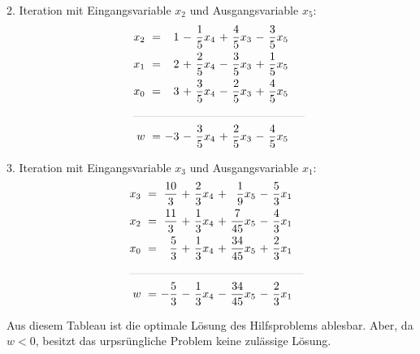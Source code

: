 \documentclass [a4paper,11pt]{article}
\begin{document}
\begin{enumerate}
\begin{enumerate}
            2. Iteration mit Eingangsvariable $x_2$ und Ausgangsvariable $x_5$:
            \begin{align*}
            \begin{alignedat}{6}
            && x_2 &\ = &\ 1 &\ - &\ \frac{1}{5}x_4 &\ + &\ \frac{4}{5}x_3 &\ - &\ \frac{3}{5}x_5 \\
            && x_1 &\ = &\ 2 &\ + &\ \frac{2}{5}x_4 &\ - &\ \frac{3}{5}x_3 &\ + &\ \frac{1}{5}x_5 \\
            && x_0 &\ = &\ 3 &\ + &\ \frac{3}{5}x_4 &\ - &\ \frac{2}{5}x_3 &\ + &\ \frac{4}{5}x_5 \\
            &\rlap{\rule{5.3cm}{.1pt}} &&&&&&&&&\\
            && w   &\ = &\ -3 &\ - &\ \frac{3}{5}x_4 &\ + &\ \frac{2}{5}x_3 &\ - &\ \frac{4}{5}x_5
            \end{alignedat}
            \end{align*}

            3. Iteration mit Eingangsvariable $x_3$ und Ausgangsvariable $x_1$:
            \begin{align*}
            \begin{alignedat}{6}
            && x_3 &\ = &\ \frac{10}{3} &\ + &\ \frac{2}{3}x_4 &\ + &\   \frac{1}{9}x_5 &\ - &\ \frac{5}{3}x_1 \\
            && x_2 &\ = &\ \frac{11}{3} &\ + &\ \frac{1}{3}x_4 &\ + &\  \frac{7}{45}x_5 &\ - &\ \frac{4}{3}x_1 \\
            && x_0 &\ = &\  \frac{5}{3} &\ + &\ \frac{1}{3}x_4 &\ + &\ \frac{34}{45}x_5 &\ + &\ \frac{2}{3}x_1 \\
            &\rlap{\rule{5.4cm}{.1pt}} &&&&&&&&&\\
            && w   &\ = &\ -\frac{5}{3} &\ - &\ \frac{1}{3}x_4 &\ - &\ \frac{34}{45}x_5 &\ - &\ \frac{2}{3}x_1
            \end{alignedat}
            \end{align*}

            Aus diesem Tableau ist die optimale Lösung des Hilfsproblems ablesbar. Aber, da $w<0$, besitzt das urpsrüngliche Problem keine zulässige Lösung.

        \end{enumerate}
    \end{enumerate}
\end{document}
